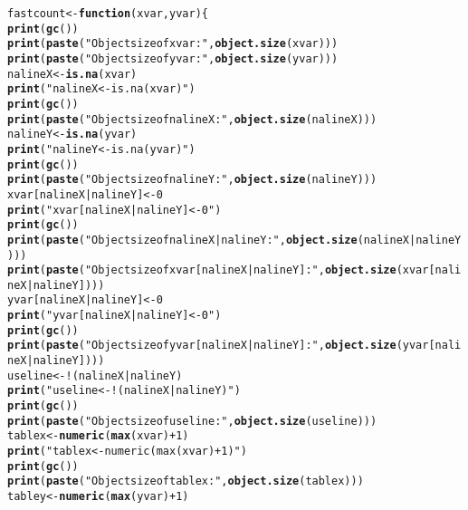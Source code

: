 \documentclass{article}\usepackage[]{graphicx}\usepackage[]{color}
\makeatletter
\newcommand{\hlnum}[1]{\textcolor[rgb]{0.686,0.059,0.569}{#1}}%
\newcommand{\hlstr}[1]{\textcolor[rgb]{0.192,0.494,0.8}{#1}}%
\newcommand{\hlopt}[1]{\textcolor[rgb]{0,0,0}{#1}}%
\newcommand{\hlstd}[1]{\textcolor[rgb]{0.345,0.345,0.345}{#1}}%
\newcommand{\hlkwa}[1]{\textcolor[rgb]{0.161,0.373,0.58}{\textbf{#1}}}%
\newcommand{\hlkwb}[1]{\textcolor[rgb]{0.69,0.353,0.396}{#1}}%
\newcommand{\hlkwc}[1]{\textcolor[rgb]{0.333,0.667,0.333}{#1}}%
\newcommand{\hlkwd}[1]{\textcolor[rgb]{0.737,0.353,0.396}{\textbf{#1}}}%
\newenvironment{kframe}{%
 \def\at@end@of@kframe{}%
 \ifinner\ifhmode%
  \def\at@end@of@kframe{\end{minipage}}%
  \begin{minipage}{\columnwidth}%
 \fi\fi%
 \def\FrameCommand##1{\hskip\@totalleftmargin \hskip-\fboxsep
 \colorbox{shadecolor}{##1}\hskip-\fboxsep
     \hskip-\linewidth \hskip-\@totalleftmargin \hskip\columnwidth}%
 \MakeFramed {\advance\hsize-\width
   \@totalleftmargin\z@ \linewidth\hsize
   \@setminipage}}%
 {\par\unskip\endMakeFramed%
 \at@end@of@kframe}
\newenvironment{knitrout}{}{} %
\makeatother
\begin{document}
\begin{knitrout}
\begin{kframe}
\begin{alltt}
\hlstd{fastcount} \hlkwb{<-} \hlkwa{function}\hlstd{(}\hlkwc{xvar}\hlstd{,}\hlkwc{yvar}\hlstd{) \{}
  \hlkwd{print}\hlstd{(}\hlkwd{gc}\hlstd{())}
  \hlkwd{print}\hlstd{(}\hlkwd{paste}\hlstd{(}\hlstr{"Object size of xvar:"}\hlstd{,} \hlkwd{object.size}\hlstd{(xvar)))}
  \hlkwd{print}\hlstd{(}\hlkwd{paste}\hlstd{(}\hlstr{"Object size of yvar:"}\hlstd{,} \hlkwd{object.size}\hlstd{(yvar)))}
  \hlstd{nalineX} \hlkwb{<-} \hlkwd{is.na}\hlstd{(xvar)}
  \hlkwd{print}\hlstd{(}\hlstr{"nalineX <- is.na(xvar)"}\hlstd{)}
  \hlkwd{print}\hlstd{(}\hlkwd{gc}\hlstd{())}
  \hlkwd{print}\hlstd{(}\hlkwd{paste}\hlstd{(}\hlstr{"Object size of nalineX:"}\hlstd{,} \hlkwd{object.size}\hlstd{(nalineX)))}
  \hlstd{nalineY} \hlkwb{<-} \hlkwd{is.na}\hlstd{(yvar)}
  \hlkwd{print}\hlstd{(}\hlstr{"nalineY <- is.na(yvar)"}\hlstd{)}
  \hlkwd{print}\hlstd{(}\hlkwd{gc}\hlstd{())}
  \hlkwd{print}\hlstd{(}\hlkwd{paste}\hlstd{(}\hlstr{"Object size of nalineY:"}\hlstd{,} \hlkwd{object.size}\hlstd{(nalineY)))}
  \hlstd{xvar[nalineX} \hlopt{|} \hlstd{nalineY]} \hlkwb{<-} \hlnum{0}
  \hlkwd{print}\hlstd{(}\hlstr{"xvar[nalineX | nalineY] <- 0"}\hlstd{)}
  \hlkwd{print}\hlstd{(}\hlkwd{gc}\hlstd{())}
  \hlkwd{print}\hlstd{(}\hlkwd{paste}\hlstd{(}\hlstr{"Object size of nalineX | nalineY:"}\hlstd{,} \hlkwd{object.size}\hlstd{(nalineX} \hlopt{|} \hlstd{nalineY)))}
  \hlkwd{print}\hlstd{(}\hlkwd{paste}\hlstd{(}\hlstr{"Object size of xvar[nalineX | nalineY]:"}\hlstd{,} \hlkwd{object.size}\hlstd{(xvar[nalineX} \hlopt{|} \hlstd{nalineY])))}
  \hlstd{yvar[nalineX} \hlopt{|} \hlstd{nalineY]} \hlkwb{<-} \hlnum{0}
  \hlkwd{print}\hlstd{(}\hlstr{"yvar[nalineX | nalineY] <- 0"}\hlstd{)}
  \hlkwd{print}\hlstd{(}\hlkwd{gc}\hlstd{())}
  \hlkwd{print}\hlstd{(}\hlkwd{paste}\hlstd{(}\hlstr{"Object size of yvar[nalineX | nalineY]:"}\hlstd{,} \hlkwd{object.size}\hlstd{(yvar[nalineX} \hlopt{|} \hlstd{nalineY])))}
  \hlstd{useline} \hlkwb{<-} \hlopt{!}\hlstd{(nalineX} \hlopt{|} \hlstd{nalineY)}
  \hlkwd{print}\hlstd{(}\hlstr{"useline <- !(nalineX | nalineY)"}\hlstd{)}
  \hlkwd{print}\hlstd{(}\hlkwd{gc}\hlstd{())}
  \hlkwd{print}\hlstd{(}\hlkwd{paste}\hlstd{(}\hlstr{"Object size of useline:"}\hlstd{,} \hlkwd{object.size}\hlstd{(useline)))}
  \hlstd{tablex} \hlkwb{<-} \hlkwd{numeric}\hlstd{(}\hlkwd{max}\hlstd{(xvar)}\hlopt{+}\hlnum{1}\hlstd{)}
  \hlkwd{print}\hlstd{(}\hlstr{"tablex <- numeric(max(xvar)+1)"}\hlstd{)}
  \hlkwd{print}\hlstd{(}\hlkwd{gc}\hlstd{())}
  \hlkwd{print}\hlstd{(}\hlkwd{paste}\hlstd{(}\hlstr{"Object size of tablex:"}\hlstd{,} \hlkwd{object.size}\hlstd{(tablex)))}
  \hlstd{tabley} \hlkwb{<-} \hlkwd{numeric}\hlstd{(}\hlkwd{max}\hlstd{(yvar)}\hlopt{+}\hlnum{1}\hlstd{)}

\end{alltt}
\end{kframe}
\end{knitrout}
\end{document}

